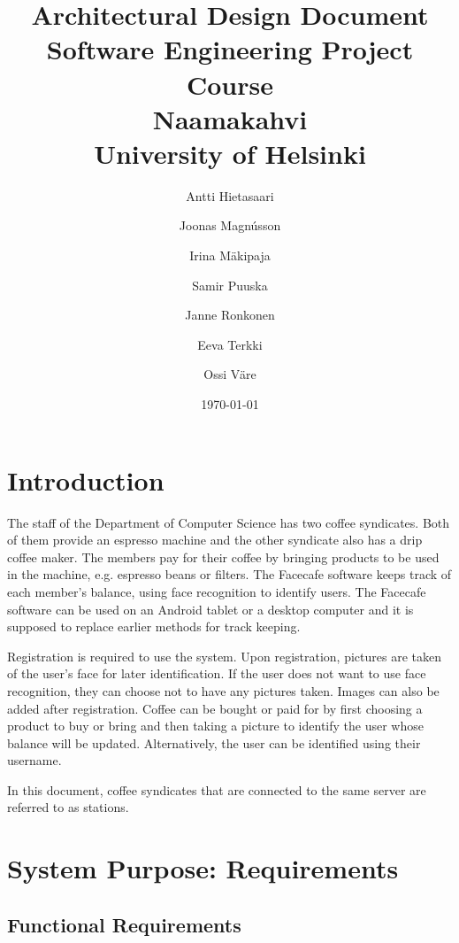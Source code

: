 \documentclass[11pt]{article}
\title{Architectural Design Document\\
  Software Engineering Project Course\\
  Naamakahvi\\
  University of Helsinki}
\author{Antti Hietasaari
  \and Joonas Magnússon
  \and Irina Mäkipaja
  \and Samir Puuska
  \and Janne Ronkonen
  \and Eeva Terkki
  \and Ossi Väre}
\date{\today}
\begin{document}
\maketitle

\tableofcontents



\section{Introduction}

The staff of the Department of Computer Science has two coffee syndicates. 
Both of them provide an espresso machine and the other syndicate also has 
a drip coffee maker. The members pay for their coffee by bringing products 
to be used in the machine, e.g. espresso beans or filters. The Facecafe 
software keeps track of each member’s balance, using face recognition to 
identify users. The Facecafe software can be used on an Android tablet
or a desktop computer and it is supposed to replace earlier 
methods for track keeping.

Registration is required to use the system. Upon registration, pictures are
taken of the user's face for later identification. If the user does not want
to use face recognition, they can choose not to have any pictures taken. 
Images can also be added after registration. Coffee can be bought or paid for 
by first choosing a product to buy or bring and then taking a picture to identify
the user whose balance will be updated. Alternatively, the user can be identified 
using their username. 

In this document, coffee syndicates that are connected to the same server are 
referred to as stations.
\section{System Purpose: Requirements}

\subsection{Functional Requirements}
\end{document}
